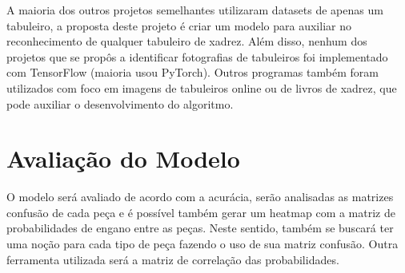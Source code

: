 \documentclass[a4paper,12pt,twoside]{article}
\begin{document}
A maioria dos outros projetos semelhantes utilizaram datasets de apenas um tabuleiro,
a proposta deste projeto é criar um modelo para auxiliar no reconhecimento de qualquer tabuleiro de xadrez.
Além disso, nenhum dos projetos que se propôs a identificar fotografias de tabuleiros foi implementado com TensorFlow
(maioria usou PyTorch).
Outros programas também foram utilizados com foco em imagens de tabuleiros online ou de livros de xadrez,
que pode auxiliar o desenvolvimento do algoritmo.

\section{Avaliação do Modelo}
O modelo será avaliado de acordo com a acurácia,
serão analisadas as matrizes confusão de cada peça e é possível também gerar um
heatmap com a matriz de probabilidades de engano entre as peças.
Neste sentido, também se buscará ter uma noção para cada tipo de peça fazendo o uso de sua matriz confusão.
Outra ferramenta utilizada será a matriz de correlação das probabilidades.

\nocite{*}
\printbibliography
\end{document}
